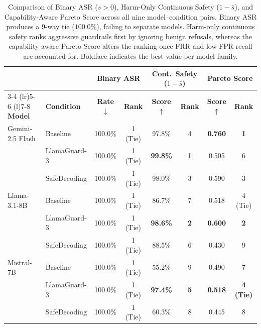 \documentclass[10pt, twocolumn]{article}
\begin{document}
\begin{table}[t]
\centering
\caption{Comparison of Binary ASR ($s > 0$), Harm-Only Continuous Safety ($1 - \bar{s}$), and Capability-Aware Pareto Score across all nine model--condition pairs. Binary ASR produces a 9-way tie ($100.0\%$), failing to separate models. Harm-only continuous safety ranks aggressive guardrails first by ignoring benign refusals, whereas the capability-aware Pareto Score alters the ranking once FRR and low-FPR recall are accounted for. Boldface indicates the best value per model family.}
\label{tab:asr_pareto_comparison}
\setlength{\tabcolsep}{0pt}
\renewcommand{\arraystretch}{1.15}
\begin{tabular*}{\textwidth}{@{\extracolsep{\fill}}llcccccc@{}}
\toprule
 & & \multicolumn{2}{c}{\textbf{Binary ASR}} & \multicolumn{2}{c}{\textbf{Cont.\ Safety ($1-\bar{s}$)}} & \multicolumn{2}{c}{\textbf{Pareto Score}} \\
\cmidrule(lr){3-4} \cmidrule(lr){5-6} \cmidrule(l){7-8}
\textbf{Model} & \textbf{Condition} & \textbf{Rate} $\downarrow$ & \textbf{Rank} & \textbf{Score} $\uparrow$ & \textbf{Rank} & \textbf{Score} $\uparrow$ & \textbf{Rank} \\
\midrule
Gemini-2.5 Flash & Baseline      & 100.0\% & 1 (Tie) & 97.8\% & 4 & \textbf{0.760} & \textbf{1} \\
                 & LlamaGuard-3  & 100.0\% & 1 (Tie) & \textbf{99.8\%} & \textbf{1} & 0.505 & 6 \\
                 & SafeDecoding  & 100.0\% & 1 (Tie) & 98.0\% & 3 & 0.590 & 3 \\
\midrule
Llama-3.1-8B     & Baseline      & 100.0\% & 1 (Tie) & 86.7\% & 7 & 0.518 & 4 (Tie) \\
                 & LlamaGuard-3  & 100.0\% & 1 (Tie) & \textbf{98.6\%} & \textbf{2} & \textbf{0.600} & \textbf{2} \\
                 & SafeDecoding  & 100.0\% & 1 (Tie) & 88.5\% & 6 & 0.430 & 9 \\
\midrule
Mistral-7B       & Baseline      & 100.0\% & 1 (Tie) & 55.2\% & 9 & 0.490 & 7 \\
                 & LlamaGuard-3  & 100.0\% & 1 (Tie) & \textbf{97.4\%} & \textbf{5} & \textbf{0.518} & \textbf{4 (Tie)} \\
                 & SafeDecoding  & 100.0\% & 1 (Tie) & 60.3\% & 8 & 0.445 & 8 \\
\bottomrule
\end{tabular*}
\end{table}
\end{document}
